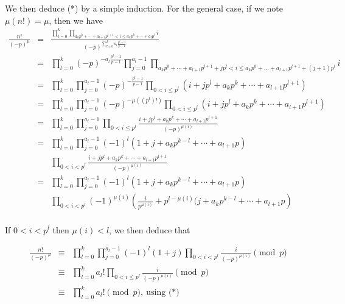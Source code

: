 \documentclass[a4paper,12pt]{article}
\begin{document}
We then deduce (*) by a simple induction.  For the general case, if we
note $\mu(n!) = \mu$, then we have
\begin{eqnarray*}
  \frac{n!}{(-p)^{\mu}} &=& \frac{\prod_{l=0}^k \prod_{a_k
      p^k+\cdots+a_{l+1}p^{l+1} < i \le a_k p^k + \cdots + a_l p^l}
    i}{(-p)^{\sum_{l=0}^k a_l \frac{p^l-1}{p-1}}} \\
  &=& \prod_{l=0}^k (-p)^{-a_l\frac{p^l-1}{p-1}} \prod_{j=0}^{a_l - 1}
  \prod_{a_kp^k+\cdots+a_{l+1}p^{l+1} + jp^l < i \le a_k p^k + \ldots
    + a_{l+1}p^{l+1} + (j+1)p^l} i \\
  &=& \prod_{l=0}^k \prod_{j=0}^{a_l-1} (-p)^{-\frac{p^l-1}{p-1}}
  \prod_{0 < i \le p^l} (i + j p^l + a_k p^k + \cdots + a_{l+1}
  p^{l+1}) \\
  &=& \prod_{l=0}^k \prod_{j=0}^{a_l-1} (-p)^{-\mu((p^l)!)}
  \prod_{0 < i \le p^l} (i + j p^l + a_k p^k + \cdots + a_{l+1} p^{l+1}) \\
  &=& \prod_{l=0}^k \prod_{j=0}^{a_l-1} \prod_{0 < i \le p^l} \frac{i + j
    p^l + a_k p^k + \cdots + a_{l+1}p^{l+1}}{(-p)^{\mu(i)}} \\
  &=& \prod_{l=0}^k \prod_{j=0}^{a_l-1} (-1)^l (1+j + a_k p^{k-l} +
  \cdots + a_{l+1}p) \\
  &&\prod_{0 < i < p^l} \frac{i + j p^l + a_k p^k + \cdots +
    a_{l+1}p^{l+1}}{(-p)^{\mu(i)}} \\
  &=& \prod_{l=0}^k \prod_{j=0}^{a_l-1} (-1)^l (1+j + a_k p^{k-l} +
  \cdots + a_{l+1}p) \\
  &&\prod_{0 < i < p^l} (-1)^{\mu(i)} \left(\frac{i}{p^{\mu(i)}} +
  p^{l-\mu(i)} (j + a_k p^{k-l} + \cdots + a_{l+1}p\right) \\
\end{eqnarray*}

If $0 < i < p^l$ then $\mu(i) < l$, we then deduce that

\begin{eqnarray*}
  \frac{n!}{(-p)^\mu} &\equiv& \prod_{l=0}^k \prod_{j=0}^{a_l - 1}
  (-1)^l (1+j) \prod_{0<i<p^l} \frac{i}{(-p)^{\mu(i)}} \pmod p \\
  &\equiv& \prod_{l=0}^k a_l! \prod_{0<i\le p^l}
  \frac{i}{(-p)^{\mu(i)}} \pmod p \\
  &\equiv& \prod_{l=0}^k a_l! \pmod p,\ \mbox{using (*)}
\end{eqnarray*}
\end{document}
